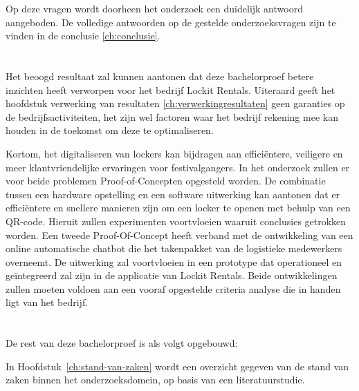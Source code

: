 Op deze vragen wordt doorheen het onderzoek een duidelijk antwoord aangeboden. De volledige antwoorden op de gestelde onderzoeksvragen zijn te vinden in de conclusie \ref{ch:conclusie}.
\newpage


\section{}%
\label{sec:onderzoeksdoelstelling}
Het beoogd resultaat zal kunnen aantonen dat deze bachelorproef betere inzichten heeft verworpen voor het bedrijf Lockit Rentals. Uiteraard geeft het hoofdstuk verwerking van resultaten \ref{ch:verwerkingresultaten} geen garanties op de bedrijfsactiviteiten, het zijn wel factoren waar het bedrijf rekening mee kan houden in de toekomst om deze te optimaliseren.

Kortom, het digitaliseren van lockers kan bijdragen aan efficiëntere, veiligere en meer klantvriendelijke ervaringen voor festivalgangers. In het onderzoek zullen er voor beide problemen Proof-of-Concepten opgesteld worden. De combinatie tussen een hardware opstelling en een software uitwerking kan aantonen dat er efficiëntere en snellere manieren zijn om een locker te openen met behulp van een QR-code. Hieruit zullen experimenten voortvloeien waaruit conclusies getrokken worden. Een tweede Proof-Of-Concept heeft verband met de ontwikkeling van een online automatische chatbot die het takenpakket van de logistieke medewerkers overneemt. De uitwerking zal voortvloeien in een prototype dat operationeel en geïntegreerd zal zijn in de applicatie van Lockit Rentals. Beide ontwikkelingen zullen moeten voldoen aan een vooraf opgestelde criteria analyse die in handen ligt van het bedrijf. 


\section{}%
\label{sec:opzet-bachelorproef}

De rest van deze bachelorproef is als volgt opgebouwd:

In Hoofdstuk~\ref{ch:stand-van-zaken} wordt een overzicht gegeven van de stand van zaken binnen het onderzoeksdomein, op basis van een literatuurstudie.

